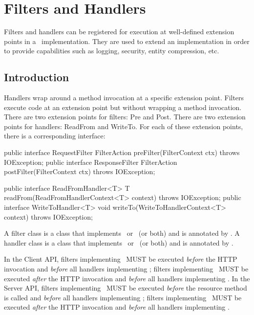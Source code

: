\chapter{Filters and Handlers}
\label{filters_and_handlers}

Filters and handlers can be registered for execution at well-defined extension points in a \jaxrs\ implementation. They are used to extend an implementation in order to provide capabilities such as logging, security, entity compression, etc. 

\section{Introduction}
\label{introduction}
Handlers wrap around a method invocation at a specific extension point. Filters execute code at an extension point but without wrapping a method invocation. There are two extension points for filters: Pre and Post. There are two extension points for handlers: ReadFrom and WriteTo.  For each of these extension points, there is a corresponding interface:

\begin{listing}{1}
public interface RequestFilter {
    FilterAction preFilter(FilterContext ctx) throws IOException;
}
public interface ResponseFilter {
    FilterAction postFilter(FilterContext ctx) throws IOException;
}
\end{listing}

\begin{listing}{1}
public interface ReadFromHandler<T> {
    T readFrom(ReadFromHandlerContext<T> context) throws IOException;
}
public interface WriteToHandler<T> {
    void writeTo(WriteToHandlerContext<T> context) throws IOException;
}
\end{listing}

A filter class is a class that implements \RequestFilter\ or \ResponseFilter\ (or both) and is annotated by \Provider. A handler class is a class that implements \ReadFromHandler\ or \WriteToHandler\ (or both) and is annotated by \Provider. 

In the Client API, filters implementing \RequestFilter\ MUST be executed \emph{before} the HTTP invocation and \emph{before} all handlers implementing \WriteToHandler; filters implementing \ResponseFilter\ MUST be executed \emph{after} the HTTP invocation and \emph{before} all handlers implementing \ReadFromHandler. 
In the Server API, filters implementing \RequestFilter\ MUST be executed \emph{before} the resource method is called and \emph{before} all handlers implementing \ReadFromHandler; filters implementing \ResponseFilter\ MUST be executed \emph{after} the HTTP invocation and \emph{before} all handlers implementing \WriteToHandler. 

